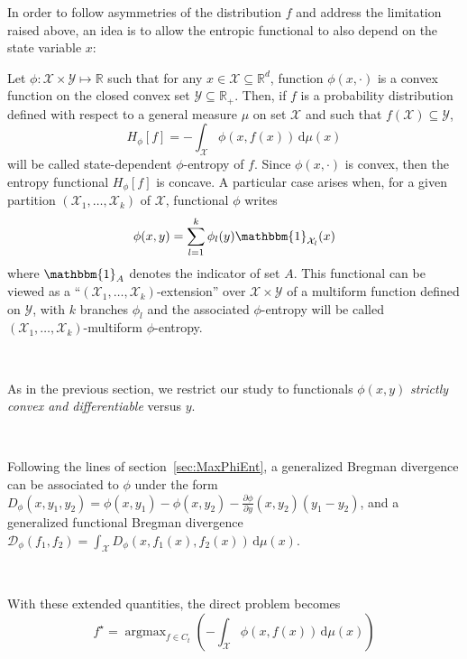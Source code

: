 \documentclass[entropy,article,submit,moreauthors,pdftex]{Definitions/mdpi}
\def\dmu{\mathrm{d}\mu}%
\def\fD{\mathcal{D}}%
\def\Rset{\mathbb{R}}%
\def\X{\mathcal{X}}%
\def\Y{\mathcal{Y}}%
\def\un{\mathbbm{1}}%
\DeclareMathOperator*{\argmax}{\operatorname{argmax}}%
\begin{document}
In  order  to  follow  asymmetries  of the  distribution  $f$  and  address  the
limitation raised  above, an idea  is to allow  the entropic functional  to also
depend on the state variable $x$:
%
\begin{Definition}
\label{def:asym_phi-entropy}
%
  Let $\phi: \X \times  \Y \mapsto \Rset$ such that for any  $x \in \X \subseteq
  \Rset^d$, function $\phi(x,\cdot)$  is a convex function on  the closed convex
  set  $\Y \subseteq  \Rset_+$.   Then,  if $f$  is  a probability  distribution
  defined with  respect to  a general measure  $\mu$ on set  $\X$ and  such that
  $f(\X) \subseteq \Y$,
  \begin{equation}\label{eq:asym_phi-entropy}
  H_\phi[f] = - \int_\X \phi(x,f(x)) \, \dmu(x)
  \end{equation}
  will be  called state-dependent $\phi$-entropy of  $f$.  Since $\phi(x,\cdot)$
  is convex, then the entropy functional $H_\phi[f]$ is concave.
  A particular case arises when, for  a given partition $(\X_1 , \ldots , \X_k)$
  of $\X$, functional $\phi$ writes
  \begin{equation}\label{eq:multiform_phi-entropy}
  \phi(x,y) = \sum_{l=1}^k \phi_l(y) \un_{\X_l}(x)
  \end{equation}
  where $\un_A$ denotes the indicator of set $A$.  This functional can be viewed
  as a ``$(\X_1 , \ldots , \X_k)$-extension'' over $\X \times \Y$ of a multiform
  function  defined on  $\Y$,  with  $k$ branches  $\phi_l$  and the  associated
  $\phi$-entropy   will   be  called   $(\X_1   ,   \ldots  ,   \X_k)$-multiform
  $\phi$-entropy.
\end{Definition}

\

As in  the previous section,  we restrict  our study to  functionals $\phi(x,y)$
{\em strictly convex and differentiable} versus $y$.

\

Following  the  lines  of  section~\ref{sec:MaxPhiEnt},  a  generalized  Bregman
divergence  can be  associated to  $\phi$  under the  form $D_\phi(x,y_1,y_2)  =
\phi(x,y_1) - \phi(x,y_2) - \frac{\partial \phi}{\partial y}(x,y_2) \left( y_1 -
y_2  \right)$, and  a generalized  functional Bregman  divergence $\displaystyle
\fD_\phi(f_1,f_2) = \int_\X D_\phi(x,f_1(x),f_2(x)) \, \dmu(x)$.

\

With these extended quantities, the direct problem becomes
%
\begin{equation}\label{eq:MaxEntAsym}
f^\star = \argmax_{f \in C_t} \left( - \int_\X \phi(x,f(x)) \, \dmu(x) \right)
\end{equation}
\end{document}
